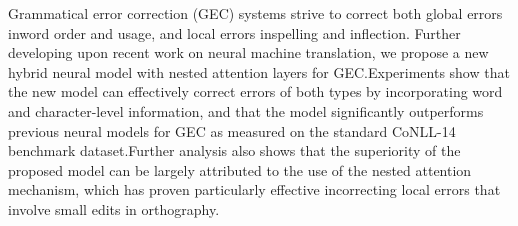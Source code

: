 Grammatical error correction (GEC) systems strive to correct both global errors inword order and usage, and local errors inspelling and inflection. Further developing upon recent work on neural machine translation, we propose a new hybrid neural model with nested attention layers for GEC.Experiments show that the new model can effectively correct errors of both types by incorporating word and character-level information, and that the model significantly outperforms previous  neural models for GEC as measured on the standard CoNLL-14 benchmark dataset.Further analysis also shows that the superiority of the proposed model can be largely attributed to the use of the nested attention mechanism, which has proven particularly effective incorrecting local errors that involve small edits in orthography.
